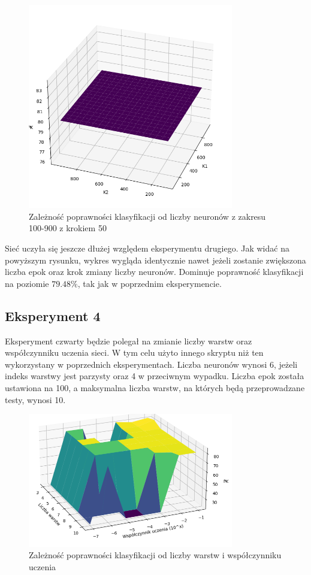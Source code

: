 \documentclass{article}
\begin{document}
\begin{figure}[H]
    \centering
    \includegraphics[width=0.8\textwidth, keepaspectratio]{k1_k2_dobre_3_950_50.png}
    \caption{Zależność poprawności klasyfikacji od liczby neuronów z zakresu 100-900 z krokiem 50}
    \label{fig:k1k2_3}
\end{figure}

Sieć uczyła się jeszcze dłużej względem eksperymentu drugiego.
Jak widać na powyższym rysunku, wykres wygląda identycznie nawet jeżeli zostanie zwiększona liczba epok oraz krok zmiany liczby neuronów.
Dominuje poprawność klasyfikacji na poziomie $79.48\%$, tak jak w poprzednim eksperymencie.

\newpage
\subsection{Eksperyment 4}
Eksperyment czwarty będzie polegał na zmianie liczby warstw oraz współczynniku uczenia sieci.
W tym celu użyto innego skryptu niż ten wykorzystany w poprzednich eksperymentach.
Liczba neuronów wynosi 6, jeżeli indeks warstwy jest parzysty oraz 4 w przeciwnym wypadku.
Liczba epok została ustawiona na 100, a maksymalna liczba warstw, na których będą przeprowadzane testy, wynosi 10.

\begin{figure}[H]
    \centering
    \includegraphics[width=0.8\textwidth, keepaspectratio]{LR_LAYERS_100ECHO.PNG}
    \caption{Zależność poprawności klasyfikacji od liczby warstw i współczynniku uczenia}
    \label{fig:lr_layers_1}
\end{figure}
\end{document}
